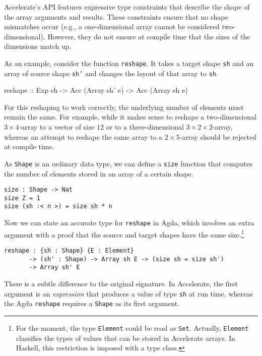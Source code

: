 \documentclass{llncs}
\begin{document}
Accelerate's API features expressive type constraints that describe
the shape of the array arguments and results. These constraints ensure
that no shape mismatches occur (e.g., a one-dimensional array cannot be
considered two-dimensional). However, they do not ensure at compile
time that the sizes of the dimensions match up.

As an example, consider the function \texttt{reshape}. 
It takes a target shape \texttt{sh} and an array of source shape
\texttt{sh'} and changes the layout of that array to \texttt{sh}. 
\begin{hcode}
reshape :: Exp sh -> Acc (Array sh' e) -> Acc (Array sh e)
\end{hcode}
For this reshaping to work correctly, the underlying
number of elements must remain the same. For example, while it makes sense
to reshape a two-dimensional $3\times 4$-array  to a vector of size
$12$ or to a three-dimensional $3\times2\times2$-array, whereas an attempt to
reshape the same array to a $2\times5$-array should be rejected at
compile time.

As \texttt{Shape} is an ordinary data type, we can define a
\texttt{size} function that computes the number of elements stored in
an array of a certain shape.
\begin{verbatim}
size : Shape -> Nat
size Z = 1
size (sh :< n >) = size sh * n
\end{verbatim}
Now we can state an accurate type for \texttt{reshape} in Agda, which
involves an extra argument with a proof that the source and
target shapes have the same size.\footnote{For the moment, the type
  \texttt{Element} could be read as \texttt{Set}. Actually,
  \texttt{Element} classifies the types of values that can be stored
  in Accelerate arrays. In Haskell, this restriction is imposed with a
  type class.}
\begin{verbatim}
reshape : {sh : Shape} {E : Element}
       -> (sh' : Shape) -> Array sh E -> (size sh = size sh')
       -> Array sh' E
\end{verbatim}
There is a subtle difference to the original signature. In
Accelerate, the first argument is an \emph{expression} that produces a
value of type \texttt{sh} at run time, whereas the Agda
\texttt{reshape} requires a \texttt{Shape} as its first argument.
\end{document}
